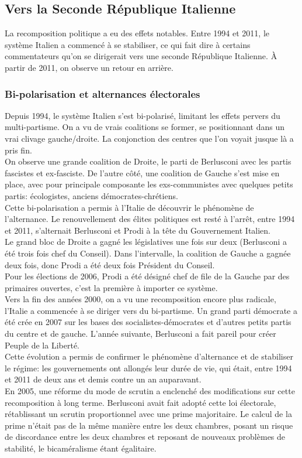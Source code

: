 \documentclass[10pt, a4paper, openany]{book}
\begin{document}
\subsection{Vers la Seconde République Italienne}

La recomposition politique a eu des effets notables. Entre 1994 et 2011, le système Italien a commencé à se stabiliser, ce qui fait dire à certains commentateurs qu'on se dirigerait vers une seconde République Italienne. À partir de 2011, on observe un retour en arrière. 

\subsubsection{Bi-polarisation et alternances électorales}

Depuis 1994, le système Italien s'est bi-polarisé, limitant les effets pervers du multi-partisme. On a vu de vrais coalitions se former, se positionnant dans un vrai clivage gauche/droite. La conjonction des centres que l'on voyait jusque là a pris fin. \\
On observe une grande coalition de Droite, le parti de Berlusconi avec les partis fascistes et ex-fasciste. De l'autre côté, une coalition de Gauche s'est mise en place, avec pour principale composante les exs-communistes avec quelques petits partis: écologistes, anciens démocrates-chrétiens. \\
Cette bi-polarisation a permis à l'Italie de découvrir le phénomène de l'alternance. Le renouvellement des élites politiques est resté à l'arrêt, entre 1994 et 2011, s'alternait Berlusconi et Prodi à la tête du Gouvernement Italien. \\
Le grand bloc de Droite a gagné les législatives une fois sur deux (Berlusconi a été trois fois chef du Conseil). Dans l'intervalle, la coalition de Gauche a gagnée deux fois, donc Prodi a été deux fois Président du Conseil. \\
Pour les élections de 2006, Prodi a été désigné chef de file de la Gauche par des primaires ouvertes, c'est la première à importer ce système. \\
Vers la fin des années 2000, on a vu une recomposition encore plus radicale, l'Italie a commencée à se diriger vers du bi-partisme. Un grand parti démocrate a été crée en 2007 sur les bases des socialistes-démocrates et d'autres petits partis du centre et de gauche. L'année suivante, Berlusconi a fait pareil pour créer Peuple de la Liberté. \\
Cette évolution a permis de confirmer le phénomène d'alternance et de stabiliser le régime: les gouvernements ont allongés leur durée de vie, qui était, entre 1994 et 2011 de deux ans et demis contre un an auparavant. \\
En 2005, une réforme du mode de scrutin a enclenché des modifications sur cette recomposition à long terme. Berlusconi avait fait adopté cette loi électorale, rétablissant un scrutin proportionnel avec une prime majoritaire. Le calcul de la prime n'était pas de la même manière entre les deux chambres, posant un risque de discordance entre les deux chambres et reposant de nouveaux problèmes de stabilité, le bicaméralisme étant égalitaire. 
\end{document}
